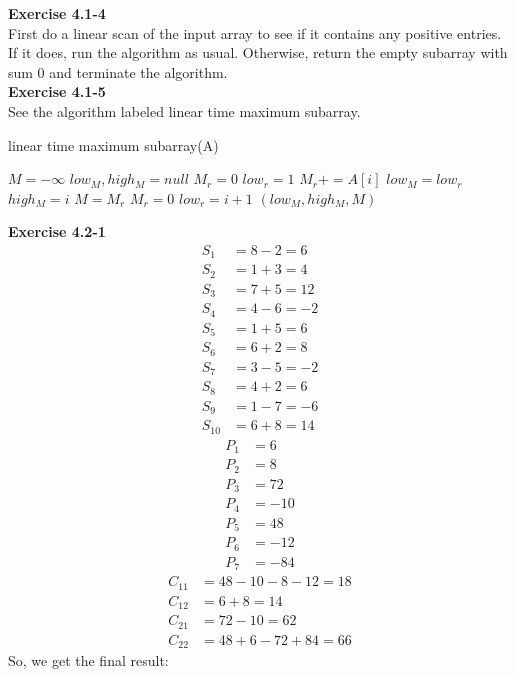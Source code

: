 \documentclass{article}
\begin{document}
\noindent\textbf{Exercise 4.1-4}\\

First do a linear scan of the input array to see if it contains any positive entries.  If it does, run the algorithm as usual.  Otherwise, return the empty subarray with sum 0 and terminate the algorithm. \\

\noindent\textbf{Exercise 4.1-5}\\

See the algorithm labeled linear time maximum subarray.

\begin{algorithm}
\caption{linear time maximum subarray(A)}
\begin{algorithmic}[1]
\State $M =-\infty$
\State $low_M, high_M = null$
\State $M_r = 0$
\State $low_r = 1$
\State $M_r += A[i]$
\State $low_M = low_r$
\State $high_M = i$
\State $M= M_r$
\EndIf
{}
\State $M_r = 0$
\State $low_r = i+1$
\EndIf
\EndFor
\State \Return $(low_M,high_M,M)$

\end{algorithmic}
\end{algorithm}

\noindent\textbf{Exercise 4.2-1}\\

\begin{align*}
S_1 &= 8-2=6\\
S_2 &= 1+3 = 4\\
S_3 &=7+5 = 12\\
S_4 &=4-6 = -2\\
S_5 &=1+5=6\\
S_6 &=6+2=8\\
S_7 &=3-5=-2\\
S_8 &=4 +2=6\\
S_9 &=1-7 = -6\\
S_{10} &=6+8=14
\end{align*}
\begin{align*}
P_1 &=6\\
P_2 &=8\\
P_3 &=72\\
P_4 &=-10\\
P_5 &=48\\
P_6 &=-12\\
P_7 &=-84
\end{align*}
\begin{align*}
C_{11} &=48 -10-8-12 = 18\\
C_{12} &= 6+8 = 14\\
C_{21} &= 72-10 = 62\\
C_{22} &=48+6-72+84 = 66
\end{align*}
So, we get the final result:
\end{document}
